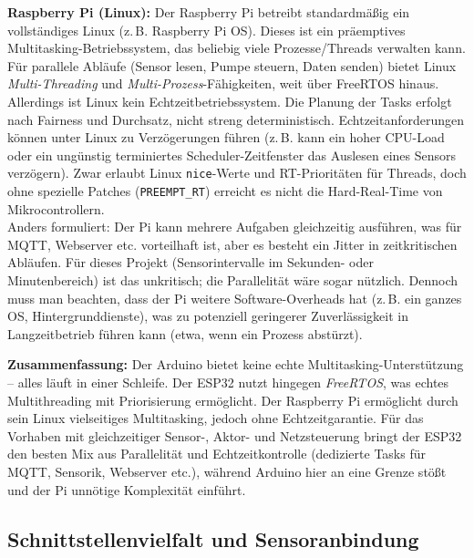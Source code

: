 \vspace{5mm}

\noindent\textbf{Raspberry Pi (Linux):} Der Raspberry Pi betreibt standardmäßig ein vollständiges Linux (z.\,B. Raspberry Pi OS). Dieses ist ein präemptives Multitasking-Betriebssystem, das beliebig viele Prozesse/Threads verwalten kann. Für parallele Abläufe (Sensor lesen, Pumpe steuern, Daten senden) bietet Linux \textit{Multi-Threading} und \textit{Multi-Prozess}-Fähigkeiten, weit über FreeRTOS hinaus. 
\\
Allerdings ist Linux kein Echtzeitbetriebssystem. Die Planung der Tasks erfolgt nach Fairness und Durchsatz, nicht streng deterministisch. Echtzeitanforderungen können unter Linux zu Verzögerungen führen (z.\,B. kann ein hoher CPU-Load oder ein ungünstig terminiertes Scheduler-Zeitfenster das Auslesen eines Sensors verzögern). Zwar erlaubt Linux \texttt{nice}-Werte und RT-Prioritäten für Threads, doch ohne spezielle Patches (\texttt{PREEMPT\_RT}) erreicht es nicht die Hard-Real-Time von Mikrocontrollern. 
\\
Anders formuliert: Der Pi kann mehrere Aufgaben gleichzeitig ausführen, was für MQTT, Webserver etc. vorteilhaft ist, aber es besteht ein Jitter in zeitkritischen Abläufen. Für dieses Projekt (Sensorintervalle im Sekunden- oder Minutenbereich) ist das unkritisch; die Parallelität wäre sogar nützlich. Dennoch muss man beachten, dass der Pi weitere Software-Overheads hat (z.\,B. ein ganzes OS, Hintergrunddienste), was zu potenziell geringerer Zuverlässigkeit in Langzeitbetrieb führen kann (etwa, wenn ein Prozess abstürzt).

\vspace{5mm}

\noindent\textbf{Zusammenfassung:} Der Arduino bietet keine echte Multitasking-Unterstützung – alles läuft in einer Schleife. Der ESP32 nutzt hingegen \textit{FreeRTOS}, was echtes Multithreading mit Priorisierung ermöglicht. \autocite{esp_datasheet} Der Raspberry Pi ermöglicht durch sein Linux vielseitiges Multitasking, jedoch ohne Echtzeitgarantie. Für das Vorhaben mit gleichzeitiger Sensor-, Aktor- und Netzsteuerung bringt der ESP32 den besten Mix aus Parallelität und Echtzeitkontrolle (dedizierte Tasks für MQTT, Sensorik, Webserver etc.), während Arduino hier an eine Grenze stößt und der Pi unnötige Komplexität einführt.

\subsection{Schnittstellenvielfalt und Sensoranbindung}

